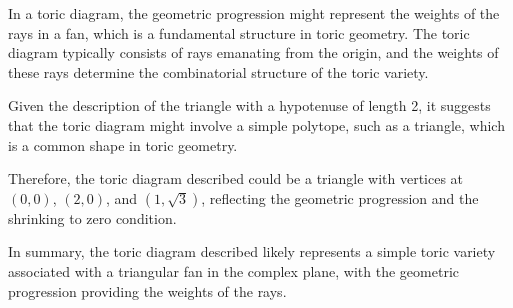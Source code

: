 In a toric diagram, the geometric progression might represent the weights of the rays in a fan, which is a fundamental structure in toric geometry. The toric diagram typically consists of rays emanating from the origin, and the weights of these rays determine the combinatorial structure of the toric variety.

Given the description of the triangle with a hypotenuse of length 2, it suggests that the toric diagram might involve a simple polytope, such as a triangle, which is a common shape in toric geometry.

Therefore, the toric diagram described could be a triangle with vertices at \((0,0)\), \((2,0)\), and \((1,\sqrt{3})\), reflecting the geometric progression and the shrinking to zero condition.

In summary, the toric diagram described likely represents a simple toric variety associated with a triangular fan in the complex plane, with the geometric progression providing the weights of the rays.